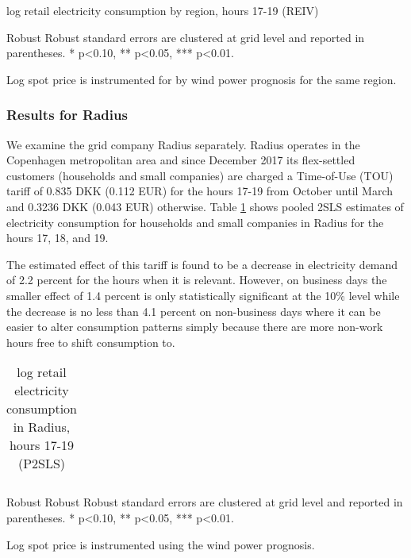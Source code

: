 \begin{table}[H]
\begin{threeparttable}
  \centering
  \caption{log retail electricity consumption by region, hours 17-19 (REIV)}
  \label{tab:r_region}
  \footnotesize
    
    \begin{tablenotes}
    \item Robust Robust standard errors are clustered at grid level and reported in parentheses. * p<0.10, ** p<0.05, *** p<0.01.
    \item Log spot price is instrumented for by wind power prognosis for the same region.
  \end{tablenotes}
\end{threeparttable}
\end{table}
\subsubsection{Results for Radius}
We examine the grid company Radius separately. Radius operates in the Copenhagen metropolitan area and since December 2017 its flex-settled customers (households and small companies) are charged a Time-of-Use (TOU) tariff of 0.835 DKK (0.112 EUR) for the hours 17-19 from October until March and 0.3236 DKK (0.043 EUR) otherwise. Table \ref{tab:r_radius} shows pooled 2SLS estimates of electricity consumption for households and small companies in Radius for the hours 17, 18, and 19.
\par
The estimated effect of this tariff is found to be a decrease in electricity demand of 2.2 percent for the hours when it is relevant. However, on business days the smaller effect of 1.4 percent is only statistically significant at the 10\% level while the decrease is no less than 4.1 percent on non-business days where it can be easier to alter consumption patterns simply because there are more non-work hours free to shift consumption to.
\begin{table}[H]
\begin{threeparttable}
  \vspace{-0.0cm}
  \centering
  \caption{log retail electricity consumption in Radius, hours 17-19 (P2SLS)}
  \label{tab:r_radius}
      \footnotesize
  \begin{tabular}{lccc}
        
  \end{tabular}
    \begin{tablenotes}
        \item  Robust Robust Robust standard errors are clustered at grid level and reported in parentheses. * p<0.10, ** p<0.05, *** p<0.01.
         \item Log spot price is instrumented using the wind power prognosis.
    \end{tablenotes}
  \vspace{-0.0cm}
  \end{threeparttable}
\end{table}


